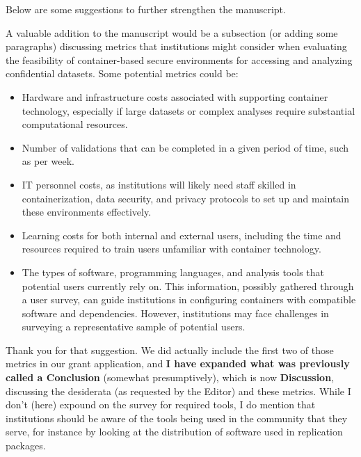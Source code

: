 \begin{referee}

Below are some suggestions to further strengthen the manuscript.

A valuable addition to the manuscript would be a subsection (or adding some paragraphs) discussing metrics that institutions might consider when evaluating the feasibility of container-based secure environments for accessing and analyzing confidential datasets.  Some potential metrics could be:
    \begin{itemize}
        \item Hardware and infrastructure costs associated with supporting container technology, especially if large datasets or complex analyses require substantial computational resources. 
        \item Number of validations that can be completed in a given period of time, such as per week. 
        \item IT personnel costs, as institutions will likely need staff skilled in containerization, data security, and privacy protocols to set up and maintain these environments effectively. 
        \item Learning costs for both internal and external users, including the time and resources required to train users unfamiliar with container technology. 
        \item The types of software, programming languages, and analysis tools that potential users currently rely on.  This information, possibly gathered through a user survey, can guide institutions in configuring containers with compatible software and dependencies. However, institutions may face challenges in surveying a representative sample of potential users. 
    \end{itemize}

\end{referee}

\begin{response}
    Thank you for that suggestion. We did actually include the first two of those metrics in our grant application, and \textbf{I have expanded what was previously called a Conclusion} (somewhat presumptively), which is now \textbf{Discussion}, discussing the desiderata (as requested by the Editor) and these metrics. While I don't (here) expound on the survey for required tools, I do mention that institutions should be aware of the tools being used in the community that they serve, for instance by looking at the distribution of software used in replication packages. 
\end{response}

